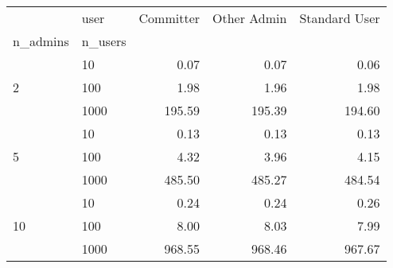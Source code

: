 \begin{tabular}{llrrr}
\toprule
 & user & Committer & Other Admin & Standard User \\
n_admins & n_users &  &  &  \\
\midrule
\multirow[t]{3}{*}{2} & 10 & 0.07 & 0.07 & 0.06 \\
 & 100 & 1.98 & 1.96 & 1.98 \\
 & 1000 & 195.59 & 195.39 & 194.60 \\
\cline{1-5}
\multirow[t]{3}{*}{5} & 10 & 0.13 & 0.13 & 0.13 \\
 & 100 & 4.32 & 3.96 & 4.15 \\
 & 1000 & 485.50 & 485.27 & 484.54 \\
\cline{1-5}
\multirow[t]{3}{*}{10} & 10 & 0.24 & 0.24 & 0.26 \\
 & 100 & 8.00 & 8.03 & 7.99 \\
 & 1000 & 968.55 & 968.46 & 967.67 \\
\cline{1-5}
\bottomrule
\end{tabular}
